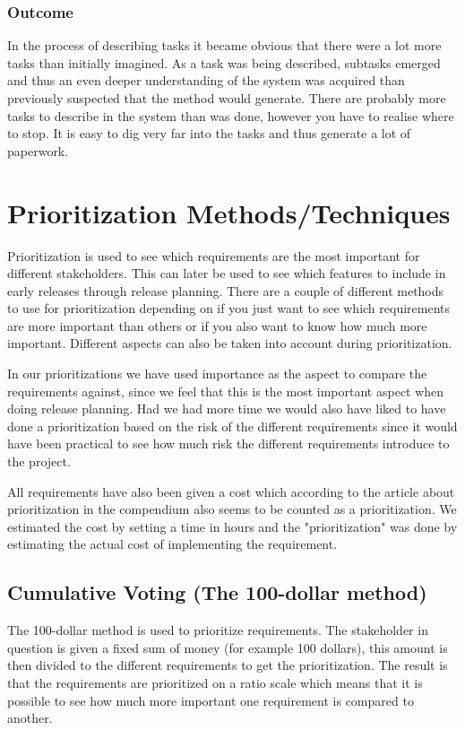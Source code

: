 \documentclass[a4paper]{article}
\begin{document}
			\subsubsection{Outcome}	
				In the process of describing tasks it became obvious that there were a lot more tasks than initially imagined. As a task was being described, subtasks emerged and thus an even deeper understanding of the system was acquired than previously suspected that the method would generate. There are probably more tasks to describe in the system than was done, however you have to realise where to stop. It is easy to dig very far into the tasks and thus generate a lot of paperwork.

	\section{Prioritization Methods/Techniques}
	Prioritization is used to see which requirements are the most important for different stakeholders. This can later be used to see which features to include in early releases through release planning. There are a couple of different methods to use for prioritization depending on if you just want to see which requirements are more important than others or if you also want to know how much more important. Different aspects can also be taken into account during prioritization. 
	
	In our prioritizations we have used importance as the aspect to compare the requirements against, since we feel that this is the most important aspect when doing release planning. Had we had more time we would also have liked to have done a prioritization based on the risk of the different requirements since it would have been practical to see how much risk the different requirements introduce to the project.
	
	All requirements have also been given a cost which according to the article about prioritization in the compendium also seems to be counted as a prioritization. We estimated the cost by setting a time in hours and the "prioritization" was done by estimating the actual cost of implementing the requirement.

	\subsection{Cumulative Voting (The 100-dollar method)}
		The 100-dollar method is used to prioritize requirements. The stakeholder in question is given a fixed sum of money (for example 100 dollars), this amount is then divided to the different requirements to get the prioritization. The result is that the requirements are prioritized on a ratio scale which means that it is possible to see how much more important one requirement is compared to another.   
\end{document}
